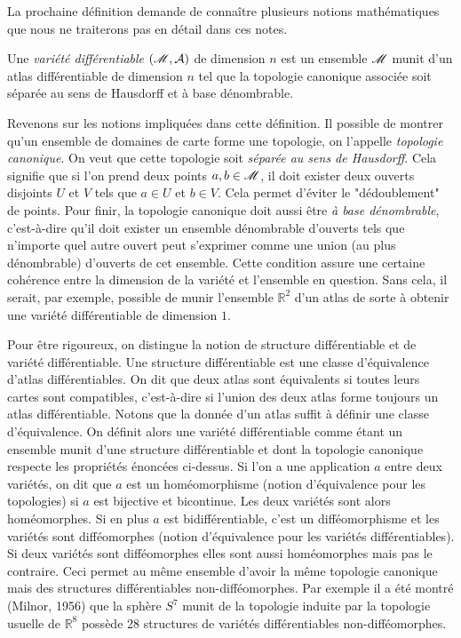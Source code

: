 \documentclass[a4paper,11pt]{report}
\begin{document}
            La prochaine définition demande de connaître plusieurs notions mathématiques que nous ne traiterons pas en détail dans ces notes.
            
            \begin{definition}
                Une \textit{variété différentiable} $(\mathscr{M},\mathcal{A})$ de dimension $n$ est un ensemble $\mathscr{M}$ munit d'un atlas différentiable de dimension $n$ tel que la topologie canonique associée soit séparée au sens de Hausdorff et à base dénombrable.
            \end{definition}
            
            Revenons sur les notions impliquées dans cette définition. Il possible de montrer qu'un ensemble de domaines de carte forme une topologie, on l'appelle \textit{topologie canonique}. On veut que cette topologie soit \textit{séparée au sens de Hausdorff}. Cela signifie que si l'on prend deux points $a, b \in \mathscr{M}$, il doit exister deux ouverts disjoints $U$ et $V$ tels que $a \in U$ et $b \in V$. Cela permet d'éviter le "dédoublement" de points. Pour finir, la topologie canonique doit aussi être \textit{à base dénombrable}, c'est-à-dire qu'il doit exister un ensemble dénombrable d'ouverts tels que n'importe quel autre ouvert peut s'exprimer comme une union (au plus dénombrable) d'ouverts de cet ensemble. Cette condition assure une certaine cohérence entre la dimension de la variété et l'ensemble en question. Sans cela, il serait, par exemple, possible de munir l'ensemble $\mathbb{R}^2$ d'un atlas de sorte à obtenir une variété différentiable de dimension $1$.
            
            \begin{rmk}
                Pour être rigoureux, on distingue la notion de structure différentiable et de variété différentiable. Une structure différentiable est une classe d'équivalence d'atlas différentiables. On dit que deux atlas sont équivalents si toutes leurs cartes sont compatibles, c'est-à-dire si l'union des deux atlas forme toujours un atlas différentiable. Notons que la donnée d'un atlas suffit à définir une classe d'équivalence. On définit alors une variété différentiable comme étant un ensemble munit d'une structure différentiable et dont la topologie canonique respecte les propriétés énoncées ci-dessus. Si l'on a une application $a$ entre deux variétés, on dit que $a$ est un homéomorphisme (notion d'équivalence pour les topologies) si $a$ est bijective et bicontinue. Les deux variétés sont alors homéomorphes. Si en plus $a$ est bidifférentiable, c'est un difféomorphisme et les variétés sont difféomorphes (notion d'équivalence pour les variétés différentiables). Si deux variétés sont difféomorphes elles sont aussi homéomorphes mais pas le contraire. Ceci permet au même ensemble d'avoir la même topologie canonique mais des structures différentiables non-difféomorphes. Par exemple il a été montré (Milnor, 1956) que la sphère $S^7$ munit de la topologie induite par la topologie usuelle de $\mathbb{R}^8$ possède 28 structures de variétés différentiables non-difféomorphes.
            \end{rmk}
            
\end{document}
